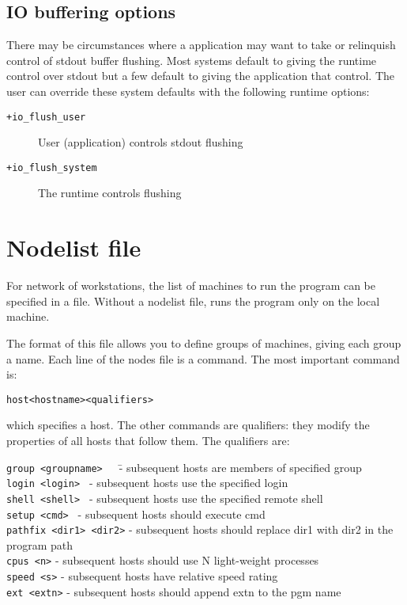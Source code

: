 \subsection{IO buffering options}
\label{io buffer options}
There may be circumstances where a \charmpp{} application may want to take
or relinquish control of stdout buffer flushing. Most systems default to
giving the \charmpp{} runtime control over stdout but a few default to
giving the application that control. The user can override these system
defaults with the following runtime options:

\begin{description}
\item[{\tt +io\_flush\_user}]     User (application) controls stdout flushing
\item[{\tt +io\_flush\_system}]   The \charmpp{} runtime controls flushing
\end{description}


\section{Nodelist file}

For network of workstations,
the list of machines to run the program can be specified in a file.
Without a nodelist file, \charmpp{} runs the program only on the
local machine.

The format of this file
allows you to define groups of machines, giving each group a name.
Each line of the nodes file is a command.  The most important command
is:

\begin{alltt}
host <hostname> <qualifiers>
\end{alltt}

which specifies a host.  The other commands are qualifiers: they modify
the properties of all hosts that follow them.  The qualifiers are:


\begin{tabbing}
{\tt group <groupname>}~~~\= - subsequent hosts are members of specified group\\
{\tt login <login>  }     \> - subsequent hosts use the specified login\\
{\tt shell <shell>  }     \> - subsequent hosts use the specified remote
shell\\
{\tt setup <cmd>  }       \> - subsequent hosts should execute cmd\\
{\tt pathfix <dir1> <dir2>}         \> - subsequent hosts should replace dir1 with dir2 in the program path\\
{\tt cpus <n>}            \> - subsequent hosts should use N light-weight processes\\
{\tt speed <s>}           \> - subsequent hosts have relative speed rating\\
{\tt ext <extn>}          \> - subsequent hosts should append extn to the pgm name\\
\end{tabbing}

